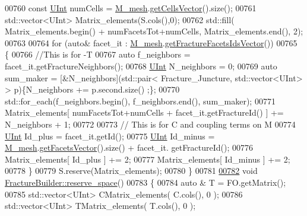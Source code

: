\begin{DoxyCode}
00760         \textcolor{keyword}{const} \hyperlink{namespaceFVCode3D_a4bf7e328c75d0fd504050d040ebe9eda}{UInt} numCells     = \hyperlink{classFVCode3D_1_1global__Operator_a027911d0f801f6f19a3006329ec30a7f}{M\_mesh}.\hyperlink{classFVCode3D_1_1Rigid__Mesh_afefb62f2c37317402b495e2369ed495b}{getCellsVector}().size(); 
00761         std::vector<UInt> Matrix\_elements(S.cols(),0);
00762     std::fill( Matrix\_elements.begin() + numFacetsTot+numCells, Matrix\_elements.end(), 2);
00763     
00764     \textcolor{keywordflow}{for} (\textcolor{keyword}{auto}& facet\_it : \hyperlink{classFVCode3D_1_1global__Operator_a027911d0f801f6f19a3006329ec30a7f}{M\_mesh}.\hyperlink{classFVCode3D_1_1Rigid__Mesh_aadbe6d9ad704122537903396d91238e0}{getFractureFacetsIdsVector}())
00765     \{   
00766                 \textcolor{comment}{//This is for -T}
00767                 \textcolor{keyword}{auto} f\_neighbors = facet\_it.getFractureNeighbors();
00768                 \hyperlink{namespaceFVCode3D_a4bf7e328c75d0fd504050d040ebe9eda}{UInt} N\_neighbors = 0;
00769         \textcolor{keyword}{auto} sum\_maker = [&N\_neighbors](std::pair< Fracture\_Juncture, std::vector<UInt> > p)\{N\_neighbors +=
       p.second.size() ;\};
00770         std::for\_each(f\_neighbors.begin(), f\_neighbors.end(), sum\_maker);
00771                 Matrix\_elements[ numFacetsTot+numCells + facet\_it.getFractureId() ] += N\_neighbors + 1;
00772                 
00773                 \textcolor{comment}{// This is for C and coupling terms on M}
00774                 \hyperlink{namespaceFVCode3D_a4bf7e328c75d0fd504050d040ebe9eda}{UInt} Id\_plus   = facet\_it.getId();
00775                 \hyperlink{namespaceFVCode3D_a4bf7e328c75d0fd504050d040ebe9eda}{UInt} Id\_minus  = \hyperlink{classFVCode3D_1_1global__Operator_a027911d0f801f6f19a3006329ec30a7f}{M\_mesh}.\hyperlink{classFVCode3D_1_1Rigid__Mesh_a6d3cdd4ef8a5225599953179d5302636}{getFacetsVector}().size() + facet\_it.
      getFractureId();
00776                 Matrix\_elements[ Id\_plus ]   += 2;
00777                 Matrix\_elements[ Id\_minus ]  += 2;      
00778         \}
00779     S.reserve(Matrix\_elements);
00780 \}
00781 
\hypertarget{global__operator_8cpp_source.tex_l00782}{}\hyperlink{classFVCode3D_1_1FractureBuilder_a27a2975168100bcf35373b4715d8b1dc}{00782} \textcolor{keywordtype}{void} \hyperlink{classFVCode3D_1_1FractureBuilder_a27a2975168100bcf35373b4715d8b1dc}{FractureBuilder::reserve\_space}()
00783 \{
00784         \textcolor{keyword}{auto} & T = FO.getMatrix();
00785         std::vector<UInt> CMatrix\_elements( C.cols(), 0 );
00786         std::vector<UInt> TMatrix\_elements( T.cols(), 0 );

\end{DoxyCode}
